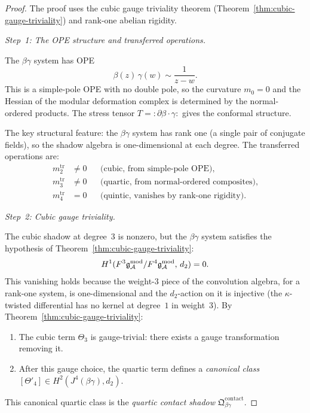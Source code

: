 \begin{proof}
The proof uses the cubic gauge triviality theorem
(Theorem~\ref{thm:cubic-gauge-triviality}) and
rank-one abelian rigidity.

\medskip
\emph{Step~1: The OPE structure and transferred operations.}

The $\beta\gamma$ system has OPE
\begin{equation}%
\beta(z)\,\gamma(w) \sim \frac{1}{z-w}.
\end{equation}
This is a simple-pole OPE with no double pole, so
the curvature $m_0 = 0$ and the Hessian of the
modular deformation complex is determined by the normal-ordered
products. The stress tensor
$T = {:}\partial\beta \cdot \gamma{:}$ gives the
conformal structure.

The key structural feature: the $\beta\gamma$ system
has rank one (a single pair of conjugate fields), so
the shadow algebra is one-dimensional at each degree.
The transferred operations are:
\begin{align*}
m_2^{\mathrm{tr}} &\neq 0
 & &\text{(cubic, from simple-pole OPE)}, \\
m_3^{\mathrm{tr}} &\neq 0
 & &\text{(quartic, from normal-ordered composites)}, \\
m_4^{\mathrm{tr}} &= 0
 & &\text{(quintic, vanishes by rank-one rigidity)}.
\end{align*}

\medskip
\emph{Step~2: Cubic gauge triviality.}

The cubic shadow at degree~$3$ is nonzero, but the
$\beta\gamma$ system satisfies the hypothesis of
Theorem~\ref{thm:cubic-gauge-triviality}:
\begin{equation}%
H^1(F^3 \gAmod / F^4 \gAmod,\, d_2) = 0.
\end{equation}
This vanishing holds because the weight-$3$ piece of the
convolution algebra, for a rank-one system, is
one-dimensional and the $d_2$-action on it is injective
(the $\kappa$-twisted differential has no kernel at
degree~$1$ in weight~$3$). By
Theorem~\ref{thm:cubic-gauge-triviality}:
\begin{enumerate}[label=(\alph*)]
\item The cubic term $\Theta_3$ is gauge-trivial:
 there exists a gauge transformation removing it.
\item After this gauge choice, the quartic term
 defines a \emph{canonical class}
 $[\Theta'_4] \in H^2(J^4(\beta\gamma), d_2)$.
\end{enumerate}
This canonical quartic class is the \emph{quartic
contact shadow}
$\mathfrak{Q}^{\mathrm{contact}}_{\beta\gamma}$.


\end{proof}

